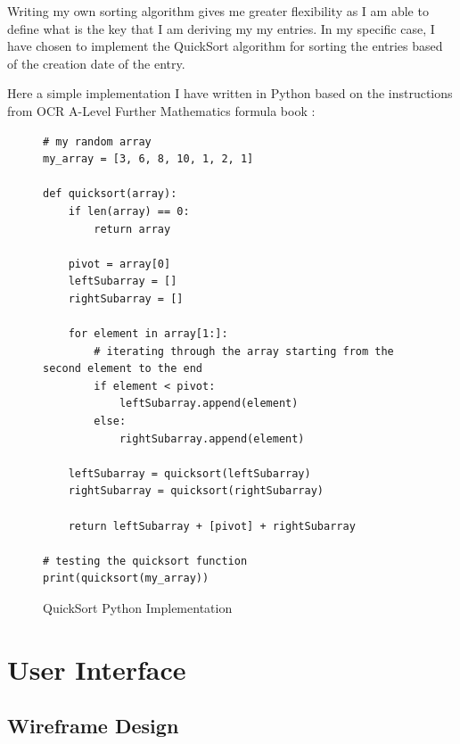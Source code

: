Writing my own sorting algorithm gives me greater flexibility as I am able to define what is the key that I am deriving my my entries. In my specific case, I have chosen to implement the QuickSort algorithm for sorting the entries based of the creation date of the entry.

Here a simple implementation I have written in Python based on the instructions from OCR A-Level Further Mathematics formula book \cite{ocr2019furthermaths}:
\newpage
\begin{figure}[H]
\begin{verbatim}
# my random array
my_array = [3, 6, 8, 10, 1, 2, 1]

def quicksort(array):
    if len(array) == 0:
        return array

    pivot = array[0]
    leftSubarray = []
    rightSubarray = []

    for element in array[1:]:
        # iterating through the array starting from the second element to the end
        if element < pivot:
            leftSubarray.append(element)
        else:
            rightSubarray.append(element)

    leftSubarray = quicksort(leftSubarray)
    rightSubarray = quicksort(rightSubarray)

    return leftSubarray + [pivot] + rightSubarray

# testing the quicksort function
print(quicksort(my_array))
\end{verbatim}
        \caption{QuickSort Python Implementation}

\end{figure}




\section{User Interface}
\subsection{Wireframe Design}

